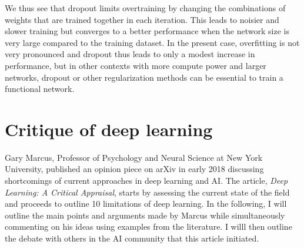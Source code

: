 \documentclass{article}
\begin{document}

We thus see that dropout limits overtraining by changing the combinations of weights that are trained together in each iteration. This leads to noisier and slower training but converges to a better performance when the network size is very large compared to the training dataset.
In the present case, overfitting is not very pronounced and dropout thus leads to only a modest increase in performance, but in other contexts with more compute power and larger networks, dropout or other regularization methods can be essential to train a functional network.

\newpage







\section{Critique of deep learning}

Gary Marcus, Professor of Psychology and Neural Science at New York University, published an opinion piece on arXiv in early 2018 discussing shortcomings of current approaches in deep learning and AI. The article, \textit{Deep Learning: A Critical Appraisal}, starts by assessing the current state of the field and proceeds to outline 10 limitations of deep learning. In the following, I will outline the main points and arguments made by Marcus while simultaneously commenting on his ideas using examples from the literature. I willl then outline the debate with others in the AI community that this article initiated.
\end{document}
